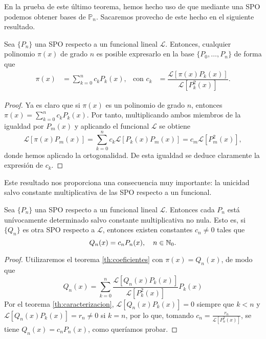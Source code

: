 En la prueba de este último teorema, hemos hecho uso de que mediante una SPO podemos obtener bases de $\mathbb P_n$. Sacaremos provecho de este hecho en el siguiente resultado.

\begin{teorema}
    \label{th:coeficientes}
    Sea $\{P_n\}$ una SPO respecto a un funcional lineal $\mathcal{L}$. Entonces, cualquier polinomio $\pi(x)$ de grado $n$ es posible expresarlo en la base $\{P_0,\dots,P_n\}$ de forma que
    \begin{align*}
        \pi(x)&=\sum_{k=0}^n c_k P_k(x), & \text{con } c_k&= \dfrac{\mathcal{L}[\pi(x)P_k(x)]}{\mathcal{L}[P_k^2(x)]}. 
    \end{align*}
\end{teorema}
\begin{proof}
    Ya es claro que si $\pi(x)$ es un polinomio de grado $n$, entonces $\pi(x)=\sum_{k=0}^n c_k P_k(x)$. Por tanto, multiplicando ambos miembros de la igualdad por $P_m(x)$ y aplicando el funcional $\mathcal{L}$ se obtiene
    $$
    \mathcal{L}[\pi(x)P_m(x)]=\sum_{k=0}^n c_k \mathcal{L}[P_k(x)P_m(x)]=c_m \mathcal{L}[P_m^2(x)], 
    $$
    donde hemos aplicado la ortogonalidad. De esta igualdad se deduce claramente la expresión de $c_k$.

\end{proof}

Este resultado nos proporciona una consecuencia muy importante: la unicidad salvo constante multiplicativa de las SPO respecto a un funcional.

\begin{corolario}
    \label{cor:unicidad-salvo-cte}
    Sea $\{P_n\}$ una SPO respecto a un funcional lineal $\mathcal{L}$. Entonces cada $P_n$ está unívocamente determinado salvo constante multiplicativa no nula. Esto es, si $\{Q_n\}$ es otra SPO respecto a $\mathcal{L}$, entonces existen constantes $c_n\not=0$ tales que
    $$
    Q_n(x)=c_n P_n(x), \ \ \ n\in\N_0.
    $$
\end{corolario}
\begin{proof}
    Utilizaremos el teorema \ref{th:coeficientes} con $\pi(x)=Q_n(x)$, de modo que
    \begin{equation*}
        Q_n(x) = \sum_{k=0}^n \dfrac{\mathcal{L}[Q_n(x)P_k(x)]}{\mathcal{L}[P_k^2(x)]} P_k(x)
    \end{equation*}
    Por el teorema \ref{th:caracterizacion}, $\mathcal{L}[Q_n(x)P_k(x)]=0$ siempre que $k<n$ y $\mathcal{L}[Q_n(x)P_k(x)]=r_n\not=0$ si $k=n$, por lo que, tomando $c_n = \frac{r_n}{\mathcal{L}[P^2_n(x)]}$, se tiene $Q_n(x) = c_n P_n(x)$, como queríamos probar.
\end{proof}


